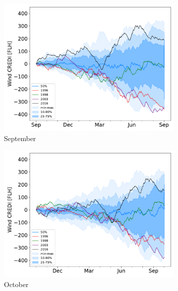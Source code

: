 \documentclass[12pt]{iopart}
\begin{document}
\begin{figure}[b]
\begin{subfigure}[t]{0.32\linewidth}
    \includegraphics[width=\linewidth]{Figures_SI/Fig_CUMSUM_YearStart_September}
    \caption{September }
\end{subfigure}
\begin{subfigure}[t]{0.32\linewidth}
    \includegraphics[width=\linewidth]{Figures_SI/Fig_CUMSUM_YearStart_October}
    \caption{October }
\end{subfigure}
\begin{subfigure}[t]{0.32\linewidth}

\end{subfigure}
\end{figure}
\end{document}

